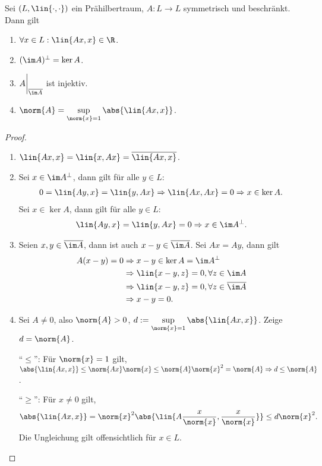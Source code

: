 \begin{prop}
\label{prop:1.28}
Sei $(L,\lin{\cdot,\cdot})$ ein Prähilbertraum, $A: L\to L$ symmetrisch und
beschränkt. Dann gilt
\begin{enumerate}[label=(\roman{*})]
  \item\label{prop:1.28:1} $\forall x\in L : \lin{Ax,x}\in\R$.
  \item\label{prop:1.28:2} $(\im A)^\bot = \ker A$.
  \item\label{prop:1.28:3} $A\bigg|_{\overline{\im A}}$ ist injektiv.
  \item\label{prop:1.28:4} $\norm{A} = \sup\limits_{\norm{x} = 1}
  \abs{\lin{Ax,x}}$.
\end{enumerate}
\end{prop}
\begin{proof}
\begin{enumerate}[label=(\roman{*})]
  \item $\lin{Ax,x} = \lin{x,Ax} = \overline{\lin{Ax,x}}$.
  \item Sei $x\in \im A^\bot$, dann gilt für alle $y\in L$:
\begin{align*}
0 = \lin{Ay,x} = \lin{y,Ax} \Rightarrow \lin{Ax,Ax} = 0 \Rightarrow x\in \ker A.
\end{align*}
Sei $x\in \ker A$, dann gilt für alle $y\in L$:
\begin{align*}
\lin{Ay,x} =\lin{y,Ax} = 0 \Rightarrow x\in\im A^\bot.
\end{align*}
\item Seien $x,y\in \overline{\im A}$, dann ist auch $x-y\in\overline{\im A}$.
Sei $Ax = Ay$, dann gilt
\begin{align*}
A(x-y) = 0&\Rightarrow x-y\in \ker A = \im A^\bot\\
&\Rightarrow \lin{x-y,z} = 0, \forall z\in \im A\\
&\Rightarrow \lin{x-y,z} = 0,\forall z\in\overline{\im A}\\
&\Rightarrow x-y = 0.
\end{align*}
\item Sei $A\neq 0$, also $\norm{A} > 0$, 
$d:=\sup\limits_{\norm{x}=1}\abs{\lin{Ax,x}}$. Zeige $d=\norm{A}$.

``$\le$'': Für $\norm{x} = 1$ gilt,
$\abs{\lin{Ax,x}} \le \norm{Ax}\norm{x}\le
\norm{A}\norm{x}^2 = \norm{A} \Rightarrow d\le\norm{A}$.

``$\ge$'': Für $x\neq 0$ gilt,
\begin{align*}
\abs{\lin{Ax,x}} = \norm{x}^2\abs{\lin{A\frac{x}{\norm{x}},\frac{x}{\norm{x}}}}
\le d\norm{x}^2.
\end{align*}
Die Ungleichung gilt offensichtlich für $x\in L$.


\end{enumerate}
\end{proof}
